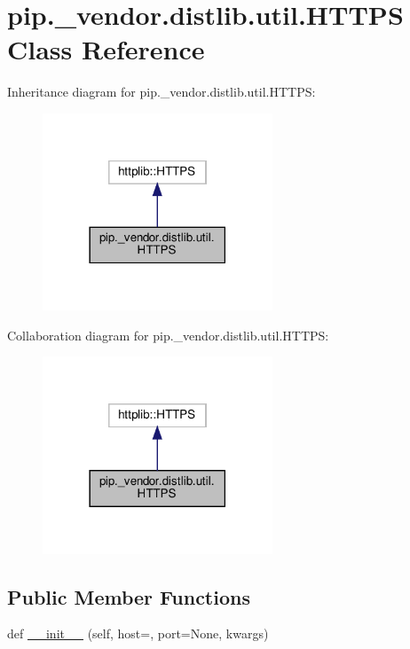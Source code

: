 \hypertarget{classpip_1_1__vendor_1_1distlib_1_1util_1_1HTTPS}{}\section{pip.\+\_\+vendor.\+distlib.\+util.\+H\+T\+T\+PS Class Reference}
\label{classpip_1_1__vendor_1_1distlib_1_1util_1_1HTTPS}


Inheritance diagram for pip.\+\_\+vendor.\+distlib.\+util.\+H\+T\+T\+PS\+:
\nopagebreak
\begin{figure}[H]
\begin{center}
\leavevmode
\includegraphics[width=194pt]{classpip_1_1__vendor_1_1distlib_1_1util_1_1HTTPS__inherit__graph}
\end{center}
\end{figure}


Collaboration diagram for pip.\+\_\+vendor.\+distlib.\+util.\+H\+T\+T\+PS\+:
\nopagebreak
\begin{figure}[H]
\begin{center}
\leavevmode
\includegraphics[width=194pt]{classpip_1_1__vendor_1_1distlib_1_1util_1_1HTTPS__coll__graph}
\end{center}
\end{figure}
\subsection*{Public Member Functions}
\begin{DoxyCompactItemize}
\item 
def \hyperlink{classpip_1_1__vendor_1_1distlib_1_1util_1_1HTTPS_a01143eaf750c0541f8fa125b90e81eda}{\+\_\+\+\_\+init\+\_\+\+\_\+} (self, host=\textquotesingle{}\textquotesingle{}, port=None, kwargs)
\end{DoxyCompactItemize}


